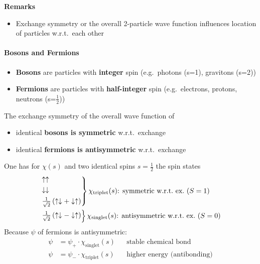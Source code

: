 \textbf{Remarks}
\begin{itemize}
    \item Exchange symmetry or the overall 2-particle wave function influences location of particles w.r.t.\ each other
\end{itemize}

\paragraph{Bosons and Fermions}
\begin{itemize}
    \item \textbf{Bosons} are particles with \textbf{integer} spin (e.g.\ photons (s=1), gravitons (s=2))
    \item \textbf{Fermions} are particles with \textbf{half-integer} spin (e.g.\ electrons, protons, neutrons (s=$\frac{1}{2}$))
\end{itemize}

\newpar{}

The exchange symmetry of the overall wave function of
\begin{itemize}
    \item identical \textbf{bosons is symmetric} w.r.t.\ exchange
    \item identical \textbf{fermions is antisymmetric} w.r.t.\ exchange
\end{itemize}

\newpar{}

One has for $\chi(s)$ and two identical spins $s=\frac{1}{2}$ the spin states
\begin{align*}
     & \begin{rcases}
           \uparrow \uparrow                                                        \\
           \downarrow \downarrow                                                    \\
           \frac{1}{\sqrt{2}}\left(\uparrow \downarrow + \downarrow \uparrow\right) \\
       \end{rcases} \chi_{\mathrm{triplet}}(s)\text{: symmetric w.r.t.\ ex.\ } (S=1) \\
     & \begin{rcases}
           \frac{1}{\sqrt{2}}\left(\uparrow \downarrow - \downarrow \uparrow\right)
       \end{rcases} \chi_{\mathrm{singlet}}(s) \text{: antisymmetric w.r.t.\ ex.\ } (S=0)
\end{align*}
Because $\psi$ of fermions is antisymmetric:
\noindent\begin{align*}
    \psi & = \psi_{+}\cdot \chi_{\mathrm{singlet}}(s) &  & \text{stable chemical bond}         \\
    \psi & = \psi_{-}\cdot \chi_{\mathrm{triplet}}(s) &  & \text{higher energy (antibonding)}
\end{align*}

